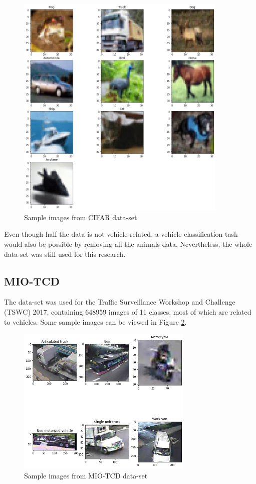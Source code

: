 \documentclass[12pt]{article}
\begin{document}
\begin{sloppypar}
\begin{figure}[hbt!]
\caption{Sample images from CIFAR data-set}
\label{img:CIFAR-images}
\centering
\includegraphics[width=0.9\textwidth]{CIFAR_images.png}
\end{figure}

\noindent
Even though half the data is not vehicle-related, a vehicle classification task would also be possible by removing all the animals data. Nevertheless, the whole data-set was still used for this research.

\subsection{MIO-TCD}
The data-set was used for the Traffic Surveillance Workshop and Challenge (TSWC) 2017, containing 648959 images of 11 classes, most of which are related to vehicles. Some sample images can be viewed in Figure \ref{img:MIOTCD-images}.

\begin{figure}[hbt!]
\caption{Sample images from MIO-TCD data-set}
\label{img:MIOTCD-images}
\centering
\includegraphics[width=0.75\textwidth]{MIOTCD_images.png}
\end{figure}


\end{sloppypar}
\end{document}
